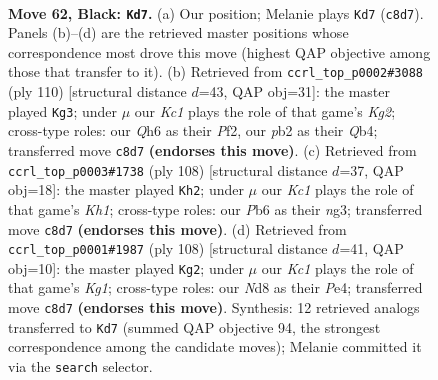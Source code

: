 \documentclass[11pt]{article}
\begin{document}
\clearpage

\begin{figure}[p]\centering
\begin{subfigure}{0.46\textwidth}\centering
\resizebox{\linewidth}{!}{%
\newchessgame
\chessboard[
  setfen={2kn2Q1/p5p1/1pp3pq/2p5/8/2P5/KP6/8 b - - 1 62},
  showmover=false,
  pgfstyle=straightmove, color=movearrow, markmove={c8-d7}
]}
\caption{}
\end{subfigure}\hfill
\begin{subfigure}{0.46\textwidth}\centering
\resizebox{\linewidth}{!}{%
\newchessgame
\chessboard[
  setfen={8/r4kp1/3Pp3/4P1Pq/1Q6/5N2/5PK1/8 w - - 7 56},
  showmover=false,
  pgfstyle=straightmove, color=movearrow, markmove={g2-g3}
]}
\caption{}
\end{subfigure}
\\[4pt]
\begin{subfigure}{0.46\textwidth}\centering
\resizebox{\linewidth}{!}{%
\newchessgame
\chessboard[
  setfen={6k1/1Q6/3P1pp1/p6p/P7/6nP/1P4P1/2q3NK w - - 9 55},
  showmover=false,
  pgfstyle=straightmove, color=movearrow, markmove={h1-h2}
]}
\caption{}
\end{subfigure}\hfill
\begin{subfigure}{0.46\textwidth}\centering
\resizebox{\linewidth}{!}{%
\newchessgame
\chessboard[
  setfen={6k1/7p/8/4QPp1/3pP1P1/7P/8/4q1K1 w - - 8 55},
  showmover=false,
  pgfstyle=straightmove, color=movearrow, markmove={g1-g2}
]}
\caption{}
\end{subfigure}
\caption{\textbf{Move 62, Black: \texttt{Kd7}.} (a) Our position; Melanie plays \texttt{Kd7} (\texttt{c8d7}). Panels (b)--(d) are the retrieved master positions whose correspondence most drove this move (highest QAP objective among those that transfer to it). (b) Retrieved from \texttt{ccrl\_top\_p0002\#3088} (ply 110) [structural distance $d$=43, QAP obj=31]: the master played \texttt{Kg3}; under $\mu$ our \emph{Kc1} plays the role of that game's \emph{Kg2}; cross-type roles: our \emph{Q}h6 as their \emph{P}f2, our \emph{p}b2 as their \emph{Q}b4; transferred move \texttt{c8d7} \textbf{(endorses this move)}. (c) Retrieved from \texttt{ccrl\_top\_p0003\#1738} (ply 108) [structural distance $d$=37, QAP obj=18]: the master played \texttt{Kh2}; under $\mu$ our \emph{Kc1} plays the role of that game's \emph{Kh1}; cross-type roles: our \emph{P}b6 as their \emph{n}g3; transferred move \texttt{c8d7} \textbf{(endorses this move)}. (d) Retrieved from \texttt{ccrl\_top\_p0001\#1987} (ply 108) [structural distance $d$=41, QAP obj=10]: the master played \texttt{Kg2}; under $\mu$ our \emph{Kc1} plays the role of that game's \emph{Kg1}; cross-type roles: our \emph{N}d8 as their \emph{P}e4; transferred move \texttt{c8d7} \textbf{(endorses this move)}. Synthesis: 12 retrieved analogs transferred to \texttt{Kd7} (summed QAP objective 94, the strongest correspondence among the candidate moves); Melanie committed it via the \texttt{search} selector.}
\label{fig:thought-m123}
\end{figure}
\end{document}
